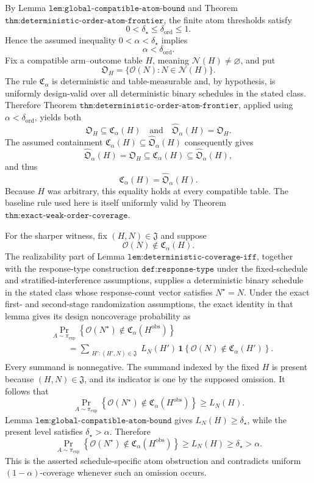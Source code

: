 By Lemma \(\texttt{lem:global-compatible-atom-bound}\) and Theorem \(\texttt{thm:deterministic-order-atom-frontier}\), the finite atom thresholds satisfy
\[
0<\delta_\star\le \delta_{\mathrm{ord}}\le 1.
\]
Hence the assumed inequality \(0<\alpha<\delta_\star\) implies
\[
\alpha<\delta_{\mathrm{ord}}.
\]
Fix a compatible arm--outcome table \(H\), meaning \(\mathcal N(H)\ne\varnothing\), and put
\[
\mathfrak O_H=\{\mathcal O(N):N\in\mathcal N(H)\}.
\]
The rule \(\mathfrak C_\alpha\) is deterministic and table-measurable and, by hypothesis, is uniformly design-valid over all deterministic binary schedules in the stated class. Therefore Theorem \(\texttt{thm:deterministic-order-atom-frontier}\), applied using \(\alpha<\delta_{\mathrm{ord}}\), yields both
\[
\mathfrak O_H\subseteq\mathfrak C_\alpha(H)
\quad\text{and}\quad
\widehat{\mathfrak O}_\alpha(H)=\mathfrak O_H.
\]
The assumed containment \(\mathfrak C_\alpha(H)\subseteq\widehat{\mathfrak O}_\alpha(H)\) consequently gives
\[
\widehat{\mathfrak O}_\alpha(H)
=\mathfrak O_H
\subseteq\mathfrak C_\alpha(H)
\subseteq\widehat{\mathfrak O}_\alpha(H),
\]
and thus
\[
\mathfrak C_\alpha(H)=\widehat{\mathfrak O}_\alpha(H).
\]
Because \(H\) was arbitrary, this equality holds at every compatible table. The baseline rule used here is itself uniformly valid by Theorem \(\texttt{thm:exact-weak-order-coverage}\).

For the sharper witness, fix \((H,N)\in\mathfrak J\) and suppose
\[
\mathcal O(N)\notin\mathfrak C_\alpha(H).
\]
The realizability part of Lemma \(\texttt{lem:deterministic-coverage-iff}\), together with the response-type construction \(\texttt{def:response-type}\) under the fixed-schedule and stratified-interference assumptions, supplies a deterministic binary schedule in the stated class whose response-count vector satisfies \(N^\star=N\). Under the exact first- and second-stage randomization assumptions, the exact identity in that lemma gives its design noncoverage probability as
\[
\begin{aligned}
&\Pr_{A\sim\pi_{\exp}}\!\left\{
\mathcal O(N^\star)\notin
\mathfrak C_\alpha(H^{\mathrm{obs}})\right\}\\
&\qquad=
\sum_{\substack{H':(H',N)\in\mathfrak J}}
L_N(H')\,
\mathbf 1\!\left\{
\mathcal O(N)\notin\mathfrak C_\alpha(H')
\right\}.
\end{aligned}
\]
Every summand is nonnegative. The summand indexed by the fixed \(H\) is present because \((H,N)\in\mathfrak J\), and its indicator is one by the supposed omission. It follows that
\[
\Pr_{A\sim\pi_{\exp}}\!\left\{
\mathcal O(N^\star)\notin
\mathfrak C_\alpha(H^{\mathrm{obs}})\right\}
\ge L_N(H).
\]
Lemma \(\texttt{lem:global-compatible-atom-bound}\) gives \(L_N(H)\ge\delta_\star\), while the present level satisfies \(\delta_\star>\alpha\). Therefore
\[
\Pr_{A\sim\pi_{\exp}}\!\left\{
\mathcal O(N^\star)\notin
\mathfrak C_\alpha(H^{\mathrm{obs}})\right\}
\ge L_N(H)\ge\delta_\star>\alpha.
\]
This is the asserted schedule-specific atom obstruction and contradicts uniform \((1-\alpha)\)-coverage whenever such an omission occurs.

